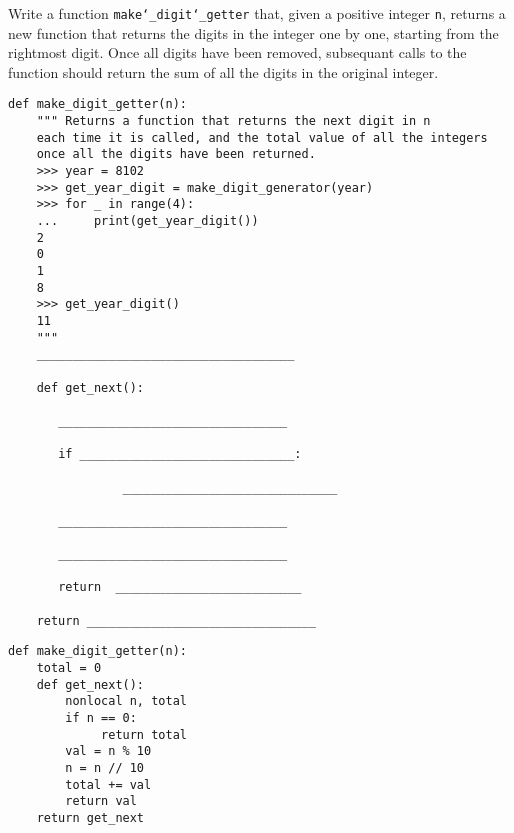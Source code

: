 \begin{blocksection}
\question Write a function \texttt{make\char`_digit\char`_getter} that, given a positive integer \texttt{n}, returns a new function that returns the digits in the integer  
one by one, starting from the rightmost digit. Once all digits have been removed, subsequant calls to the function should return the sum of all the digits in the original integer.

\begin{lstlisting}
def make_digit_getter(n):
    """ Returns a function that returns the next digit in n
    each time it is called, and the total value of all the integers
    once all the digits have been returned.
    >>> year = 8102
    >>> get_year_digit = make_digit_generator(year)
    >>> for _ in range(4):
    ...     print(get_year_digit())
    2
    0
    1
    8
    >>> get_year_digit()
    11
    """
    ____________________________________

    def get_next():
        
       ________________________________
        
       if ______________________________:

                ______________________________
        
       ________________________________
        
       ________________________________
       
       return  __________________________

    return ________________________________
\end{lstlisting}

\begin{solution}
\begin{lstlisting}
def make_digit_getter(n):
    total = 0
    def get_next():
        nonlocal n, total
        if n == 0:
             return total
        val = n % 10
        n = n // 10
        total += val
        return val
    return get_next
\end{lstlisting}
\end{solution}

\end{blocksection}
